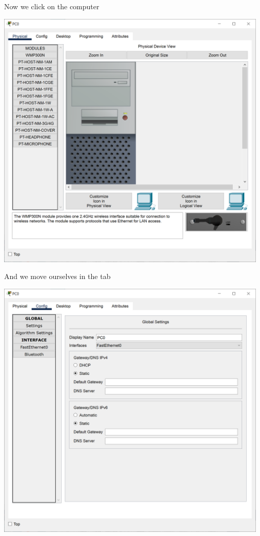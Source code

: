 \documentclass[a4paper,12pt]{article}
\begin{document}
\noindent Now we click on the computer \newline

\noindent \includegraphics[width=13cm]{./step-by-step/3.PNG}
\clearpage

\noindent And we move ourselves in the  tab \newline

\noindent \includegraphics[width=13cm]{./step-by-step/4.PNG}
\clearpage
\end{document}
